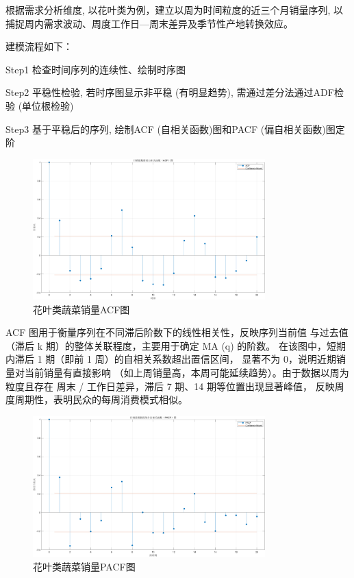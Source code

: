 \documentclass{cumcmthesis}
\begin{document}
根据需求分析维度, 以花叶类为例，建立以周为时间粒度的近三个月销量序列, 以捕捉周内需求波动、周度工作日—周末差异及季节性产地转换效应。  

建模流程如下：  

Step1 检查时间序列的连续性、绘制时序图  

Step2 平稳性检验, 若时序图显示非平稳 (有明显趋势), 需通过差分法通过ADF检验 (单位根检验)  

Step3 基于平稳后的序列, 绘制ACF (自相关函数)图和PACF (偏自相关函数)图定阶  

\begin{figure}[H]
    \centering
    \includegraphics[width=0.8\textwidth]{花叶ACF图.png} 
    \caption{花叶类蔬菜销量ACF图}
\end{figure}

ACF 图用于衡量序列在不同滞后阶数下的线性相关性，反映序列当前值
与过去值（滞后 k 期）的整体关联程度，主要用于确定 MA (q) 的阶数。
在该图中，短期内滞后 1 期（即前 1 周）的自相关系数超出置信区间，
显著不为 0，说明近期销量对当前销量有直接影响
（如上周销量高，本周可能延续趋势）。由于数据以周为粒度且存在
周末 / 工作日差异，滞后 7 期、14 期等位置出现显著峰值，
反映周度周期性，表明民众的每周消费模式相似。


\begin{figure}[H]
    \centering
    \includegraphics[width=0.8\textwidth]{花叶PACF图.png} 
    \caption{花叶类蔬菜销量PACF图}
\end{figure}
\end{document}
